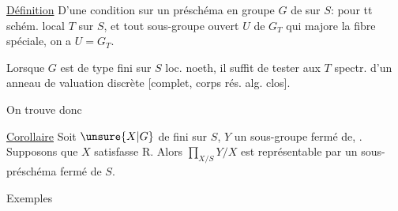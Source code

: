 

\uline{Définition} D'une condition sur un préschéma en groupe $G$ de  sur $S$:  pour tt schém. local $T$ sur $S$, et tout sous-groupe ouvert  $U$ de $G_T$ qui majore la fibre spéciale, on a $U=G_T$.


Lorsque   $G$ est de type fini sur $S$ loc. noeth, il suffit de tester aux $T$ spectr. d'un anneau de valuation discrète [complet, corps rés. alg. clos].

On trouve donc

\uline{Corollaire} Soit $\unsure{X|G}$ de  fini sur $S$,  $Y$ un sous-groupe fermé de, . Supposons que $X$ satisfasse R. Alors $\prod_{X/S}Y/X$ est représentable par un sous-préschéma fermé de $S$.

Exemples


